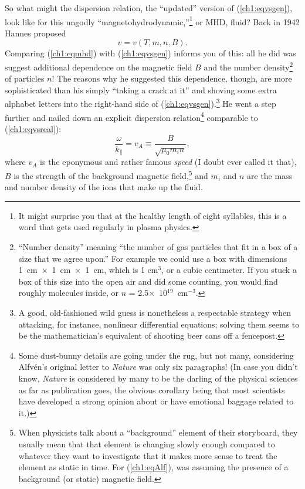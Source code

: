 So what might the dispersion relation, the ``updated'' version of
(\ref{ch1:eqvsgen}), look like for this ungodly
``magnetohydrodynamic,''\footnote{It might surprise you that at the healthy
  length of eight syllables, this is a word that gets used regularly in plasma
  physics.} or MHD, fluid? Back in 1942 Hannes \Alf proposed
\begin{equation}
  \label{ch1:eqmhd}
  v = v ( T, m, n, B).
\end{equation}
Comparing (\ref{ch1:eqmhd}) with (\ref{ch1:eqvsgen}) informs you of this: all he
did was suggest additional dependence on the magnetic field $B$ and the number
density\footnote{``Number density'' meaning ``the number of gas particles that
  fit in a box of a size that we agree upon.'' For example we could use a box
  with dimensions 1~cm~$\times$~1~cm~$\times$~1~cm, which is 1 cm$^3$, or a
  cubic centimeter. If you stuck a box of this size into the open air and did
  some counting, you would find roughly 
  molecules inside, or $n$ = 2.5$\times$~10$^{19}$~cm$^{-3}$.} of particles $n$!
The reasons why he suggested this dependence, though, are more sophisticated
than his simply ``taking a crack at it'' and shoving some extra alphabet letters
into the right-hand side of (\ref{ch1:eqvsgen}).\footnote{A good, old-fashioned
  wild guess is nonetheless a respectable strategy when attacking, for instance,
  nonlinear differential equations; solving them seems to be the mathematician's
  equivalent of shooting beer cans off a fencepost.} He went a step further and
nailed down an explicit dispersion relation\footnote{Some dust-bunny details are
  going under the rug, but not many, considering Alfv\'{e}n's original letter to
  \textsl{Nature} was only six paragraphs! (In case you didn't know,
  \textsl{Nature} is considered by many to be the darling of the physical
  sciences as far as publication goes, the obvious corollary being that most
  scientists have developed a strong opinion about or have emotional baggage
  related to it.)} comparable to (\ref{ch1:eqvsreal}):
\begin{equation}
  \label{ch1:eqAlf}
  \dfrac{\omega}{k_\parallel} = v_A \equiv \frac{B}{\sqrt{\mu_0 m_i n}},
\end{equation}
where $v_A$ is the eponymous and rather famous \textsl{\Alf speed} (I doubt \Alf
ever called it that), $B$ is the strength of the background magnetic
field,\footnote{When physicists talk about a ``background'' element of their
  storyboard, they usually mean that that element is changing slowly enough
  compared to whatever they want to investigate that it makes more sense to
  treat the element as static in time. For (\ref{ch1:eqAlf}), \Alf was
  assuming the presence of a background (or static) magnetic field.} and $m_i$
and $n$ are the mass and number density of the ions that make up the fluid.

